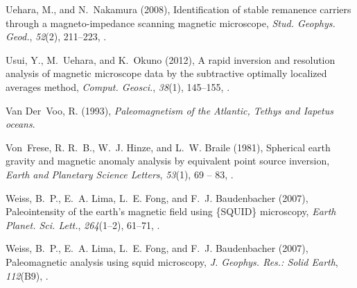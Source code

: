 \documentclass[galley,gc]{agutex}
\begin{document}
\begin{article}
\begin{thebibliography}{40}
Uehara, M., and N.~Nakamura (2008), Identification of stable remanence carriers
  through a magneto-impedance scanning magnetic microscope, \textit{Stud.
  Geophys. Geod.}, \textit{52}(2), 211--223, .

Usui, Y., M.~Uehara, and K.~Okuno (2012), A rapid inversion and resolution
  analysis of magnetic microscope data by the subtractive optimally localized
  averages method, \textit{Comput. Geosci.}, \textit{38}(1), 145--155,
  .

Van Der~Voo, R. (1993), \textit{Paleomagnetism of the Atlantic, Tethys and
  Iapetus oceans}.

Von~Frese, R. R.~B., W.~J. Hinze, and L.~W. Braile (1981), Spherical earth
  gravity and magnetic anomaly analysis by equivalent point source inversion,
  \textit{Earth and Planetary Science Letters}, \textit{53}(1), 69 -- 83,
  .

Weiss, B.~P., E.~A. Lima, L.~E. Fong, and F.~J. Baudenbacher
  (2007{}), Paleointensity of the earth's magnetic field using
  \{SQUID\} microscopy, \textit{Earth Planet. Sci. Lett.}, \textit{264}(1–2),
  61--71, .

Weiss, B.~P., E.~A. Lima, L.~E. Fong, and F.~J. Baudenbacher
  (2007{}), Paleomagnetic analysis using squid microscopy,
  \textit{J. Geophys. Res.: Solid Earth}, \textit{112}(B9),
  .

\end{thebibliography}




\end{article}
\end{document}
